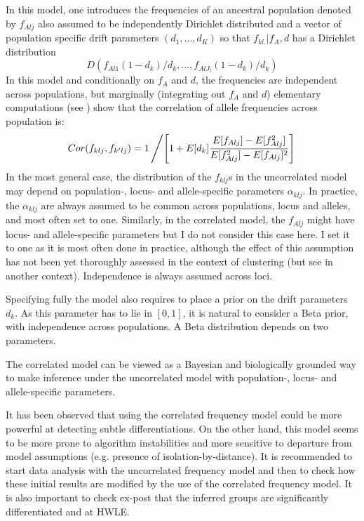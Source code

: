 \documentclass[a4paper,10pt]{article}
\begin{document}
In this model, one introduces the frequencies of an ancestral population denoted by $f_{Alj}$ also assumed to be 
independently Dirichlet distributed and a vector of population specific drift parameters $(d_1,...,d_K)$ so that 
$f_{kl.}|f_A,d$ has a Dirichlet distribution
\begin{equation}
{ D}\left(f_{Al1}(1-d_k)/d_k,...,f_{AlJ_l} (1-d_k)/d_k\right)
\end{equation}
In this model and conditionally on $f_A$ and $d$, the frequencies are independent 
across populations, but marginally (integrating out $f_A$ and $d$) elementary computations (see \citep{Guillot08b}) 
show that the correlation of allele frequencies across population is:
\begin{equation}
Cor(f_{klj},f_{k'lj}) = 1\left/ \left[1+ E[d_k]\frac{E[f_{Alj}]-E[f_{Alj}^2]}{E[f_{Alj}^2]-E[f_{Alj}]^2}\right] \right.
\end{equation}
In the most general case, the distribution of the $f_{klj}$s in the uncorrelated model may depend on 
population-, locus- and allele-specific parameters 
$\alpha_{klj}$. In practice, the $\alpha_{klj}$ are always assumed to be common across  populations, locus and alleles,  and most often set to one. 
Similarly, in the correlated model, the $f_{Alj}$ might have locus- and allele-specific parameters but I do not consider this case here.
I set it to one as it is  most often done in practice, 
although the effect of this assumption has not been yet thoroughly assessed in the context of clustering 
(but see \citep{Foll08} in another context). 
Independence is always assumed across loci. 

Specifying fully the model also requires to place a prior on the drift parameters $d_k$. As this parameter 
has to lie in $[0,1]$, it is natural to 
consider a Beta prior, with independence across populations. A Beta distribution depends on two parameters. 


The correlated model can be viewed as a Bayesian 
and  biologically grounded way to make inference under the uncorrelated model with population-, locus- and allele-specific parameters. 


It has been observed that using the correlated frequency model could be more powerful at detecting subtle differentiations. 
On the other hand, 
this model seems to be more prone to algorithm instabilities and more sensitive to departure from model assumptions 
(e.g. presence of isolation-by-distance).  
It is recommended to start data analysis with the uncorrelated frequency model and then to check how these initial results 
are modified by the use of the correlated frequency model. It is also important to check ex-post that the inferred groups 
are significantly differentiated and at HWLE.
\end{document}
